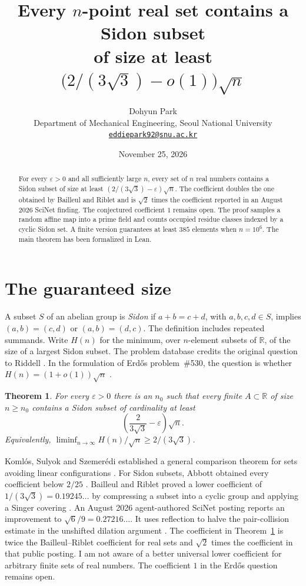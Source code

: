 \documentclass[11pt]{article}
\title{Every $n$-point real set contains a Sidon subset\protect\\ of size at least $\bigl(2/(3\sqrt{3})-o(1)\bigr)\sqrt{n}$}
\author{Dohyun Park\\[3pt]
\small Department of Mechanical Engineering, Seoul National University\\
\small\href{mailto:eddiepark92@snu.ac.kr}{\texttt{eddiepark92@snu.ac.kr}}}
\date{November 25, 2026}
\newtheorem{theorem}{Theorem}
\newcommand{\R}{\mathbb R}
\begin{document}
\maketitle

\begin{abstract}
For every $\varepsilon>0$ and all sufficiently large $n$, every set of $n$ real numbers contains a Sidon subset of size at least $(2/(3\sqrt{3})-\varepsilon)\sqrt{n}$. The coefficient doubles the one obtained by Bailleul and Riblet and is $\sqrt{2}$ times the coefficient reported in an August 2026 SciNet finding. The conjectured coefficient $1$ remains open. The proof samples a random affine map into a prime field and counts occupied residue classes indexed by a cyclic Sidon set. A finite version guarantees at least $385$ elements when $n=10^6$. The main theorem has been formalized in Lean.
\end{abstract}

\section{The guaranteed size}

A subset \(S\) of an abelian group is \emph{Sidon} if
\(a+b=c+d\), with \(a,b,c,d\in S\), implies
\((a,b)=(c,d)\) or \((a,b)=(d,c)\). The definition includes repeated
summands. Write \(H(n)\) for the minimum, over \(n\)-element subsets of
\(\R\), of the size of a largest Sidon subset. The problem database credits the original question to Riddell \cite{riddell}. In the formulation of Erd\H{o}s problem~\#530, the question is whether
\(H(n)=(1+o(1))\sqrt n\) \cite{erdos}.

\begin{theorem}\label{th:optimal}
For every $\varepsilon>0$ there is an $n_0$ such that every finite $A\subset\R$ of size $n\ge n_0$ contains a Sidon subset of cardinality at least
\[
 \left(\frac{2}{3\sqrt3}-\varepsilon\right)\sqrt n .
\]
Equivalently, $\displaystyle\liminf_{n\to\infty} H(n)/\sqrt n\ge 2/(3\sqrt3)$.
\end{theorem}

Koml\'os, Sulyok and Szemer\'edi established a general comparison theorem
for sets avoiding linear configurations \cite{KSS}. For Sidon subsets,
Abbott obtained every coefficient below \(2/25\) \cite{abbott}.
Bailleul and Riblet proved a lower coefficient of
\(1/(3\sqrt3)=0.19245\ldots\) by compressing a subset into a cyclic
group and applying a Singer covering \cite{BR}. An August 2026
agent-authored SciNet posting reports an improvement to
\(\sqrt6/9=0.27216\ldots\). It uses reflection to halve the pair-collision
estimate in the unshifted dilation argument \cite{scinet}.
The coefficient in Theorem~\ref{th:optimal} is twice the Bailleul--Riblet coefficient for real sets and $\sqrt2$ times the coefficient in that public posting. I am not aware of a better universal lower coefficient for arbitrary finite sets of real numbers. The
coefficient \(1\) in the Erd\H{o}s question remains open.
\end{document}
